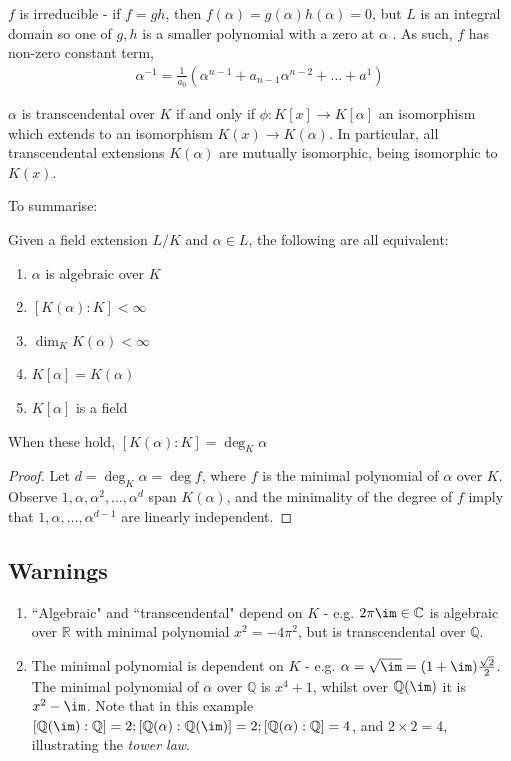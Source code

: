 \documentclass[a4paper, 10pt, twocolumn]{amsart}
\begin{document}
$f$ is irreducible - if $f = gh$, then $f(\alpha) = g(\alpha)h(\alpha) = 0$, but $L$ is an integral domain so one of $g, h$ is a smaller polynomial with a zero at $\alpha$ \contr. As such, $f$ has non-zero constant term, 
\begin{align*}
\alpha^{-1} = \frac{1}{a_0}\left(\alpha^{n-1}+a_{n-1}\alpha^{n-2}+\ldots+a^1\right)
\end{align*}
\begin{proposition}
$\alpha$ is transcendental over $K$ if and only if $\phi:K[x] \rightarrow K[\alpha]$ an isomorphism which extends to an isomorphism $K(x)\rightarrow K(\alpha)$. In particular, all transcendental extensions $K(\alpha)$ are mutually isomorphic, being isomorphic to $K(x)$.
\end{proposition}
To summarise:
\begin{proposition}
Given a field extension $L/K$ and $\alpha \in L$, the following are all equivalent:
\begin{enumerate}
\item $\alpha$ is algebraic over $K$
\item $[K(\alpha) : K] < \infty$
\item $\dim_K K(\alpha) < \infty$
\item $K[\alpha] = K(\alpha)$
\item $K[\alpha]$ is a field
\end{enumerate}
When these hold, $[K(\alpha) : K] = \deg_K \alpha$
\end{proposition}
\begin{proof}
Let $d = \deg_K \alpha = \deg f$, where $f$ is the minimal polynomial of $\alpha$ over $K$. Observe $1, \alpha, \alpha^2, \ldots, \alpha^d$ span $K(\alpha)$, and the minimality of the degree of $f$ imply that $1, \alpha, \ldots, \alpha^{d-1}$ are linearly independent.
\end{proof}

\subsection*{Warnings}
\begin{enumerate}
\item``Algebraic" and ``transcendental" depend on $K$ - e.g. $2\pi\im \in \mathbb{C}$ is algebraic over $\mathbb{R}$ with minimal polynomial $x^2 = -4\pi^2$, but is transcendental over $\mathbb{Q}$.
\item The minimal polynomial is dependent on $K$ - e.g. $\alpha = \sqrt{\im} = (1+\im)\frac{\sqrt{2}}{2}$. The minimal polynomial of $\alpha$ over $\mathbb{Q}$ is $x^4+1$, whilst over $\mathbb{Q}(\im)$ it is $x^2 - \im$. Note that in this example $[\mathbb{Q}(\im):\mathbb{Q}] = 2; [\mathbb{Q}(\alpha):\mathbb{Q}(\im)] = 2; [\mathbb{Q}(\alpha):\mathbb{Q}] = 4$, and $2\times 2=4$, illustrating the \emph{tower law}.
\end{enumerate}
\end{document}
